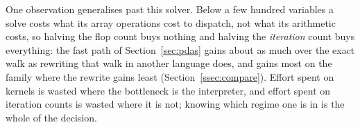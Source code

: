 One observation generalises past this solver. Below a few hundred variables a
solve costs what its array operations cost to dispatch, not what its
arithmetic costs, so halving the flop count buys nothing and halving the
\emph{iteration} count buys everything: the fast path of Section~\ref{sec:pdas}
gains about as much over the exact walk as rewriting that walk in another language
does, and gains most on the family where the rewrite gains least
(Section~\ref{ssec:compare}). Effort spent on kernels is
wasted where the bottleneck is the interpreter, and effort spent on iteration
counts is wasted where it is not; knowing which regime one is in is the whole of
the decision.
